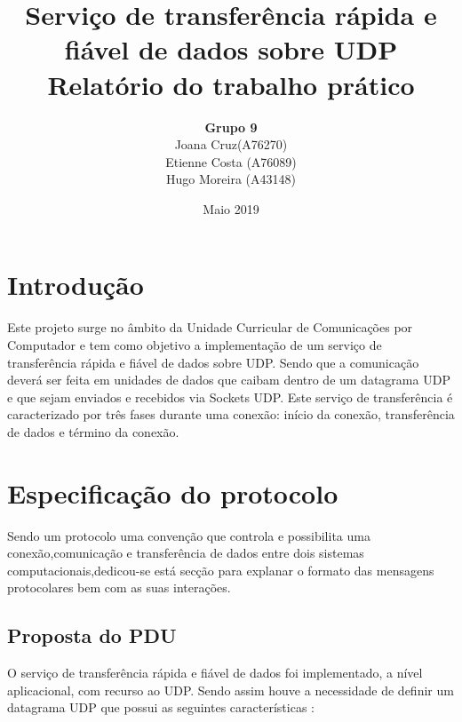 \documentclass{article}
\title{
       \vspace{60px}
       \Huge \textbf{Serviço de transferência rápida e fiável de dados sobre UDP} \\[15px]
       \Large \textbf{Relatório do trabalho prático}
      }
\author{
        \begin{tabular}{c}
            \textbf{Grupo 9} \\[5px]
                Joana Cruz(A76270) \\
                Etienne Costa (A76089) \\
                Hugo Moreira (A43148)
        \end{tabular}
       }
\date{Maio 2019}
\begin{document}
\maketitle

\newpage
\section{Introdução}

Este projeto surge no âmbito da Unidade Curricular de Comunicações por Computador e tem como objetivo a implementação de  um serviço de transferência rápida e fiável de dados sobre UDP. Sendo que a comunicação deverá ser feita em unidades de dados que caibam dentro de um datagrama UDP e que sejam enviados e recebidos via Sockets UDP.
Este serviço de transferência é caracterizado por três fases durante uma conexão: início da conexão, transferência de dados e término da conexão.


\section{Especificação do protocolo}

Sendo um protocolo uma convenção que controla e possibilita uma conexão,comunicação e transferência de dados entre dois sistemas computacionais,dedicou-se está secção para explanar o formato das mensagens protocolares bem com as suas interações.

\subsection{Proposta do PDU}

O serviço de transferência rápida e fiável de dados foi implementado, a nível aplicacional, com recurso ao UDP. Sendo assim houve a necessidade de definir um datagrama UDP  que possui as seguintes características :
\end{document}
